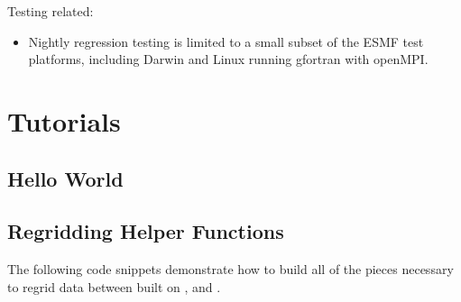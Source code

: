 \documentclass[letterpaper,10pt,english]{sphinxmanual}
\begin{document}
Testing related:
\begin{itemize}
\item {} 
Nightly regression testing is limited to a small subset of the ESMF test platforms,
including Darwin and Linux running gfortran with openMPI.

\end{itemize}


\chapter{Tutorials}
\label{\detokenize{examples:tutorials}}\label{\detokenize{examples::doc}}

\section{Hello World}
\label{\detokenize{examples:hello-world}}\begin{quote}

\begin{sphinxVerbatim}[commandchars=\\\{\}]
 


 
\end{sphinxVerbatim}
\end{quote}


\section{Regridding Helper Functions}
\label{\detokenize{examples:regridding-helper-functions}}
The following code snippets demonstrate how to build all of the pieces
necessary to regrid data between {\hyperref[\detokenize{field:ESMF.api.field.Field}]{}} built on
{\hyperref[\detokenize{grid:ESMF.api.grid.Grid}]{}}, {\hyperref[\detokenize{mesh:ESMF.api.mesh.Mesh}]{}}
and {\hyperref[\detokenize{locstream:ESMF.api.locstream.LocStream}]{}}.
\end{document}
